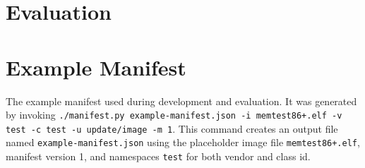 \documentclass{kththesis}
\begin{document}
\chapter{Evaluation}


\printbibliography[heading=bibintoc] %

\appendix

\chapter{Example Manifest}
\label{app:manifest}
The example manifest used during development and evaluation. It was generated by invoking
\texttt{./manifest.py example-manifest.json -i memtest86+.elf -v test -c test -u
update/image -m 1}. This command creates an output file named
\texttt{example-manifest.json} using the placeholder image file \texttt{memtest86+.elf},
manifest version 1, and namespaces \texttt{test} for both vendor and class id.


\end{document}

